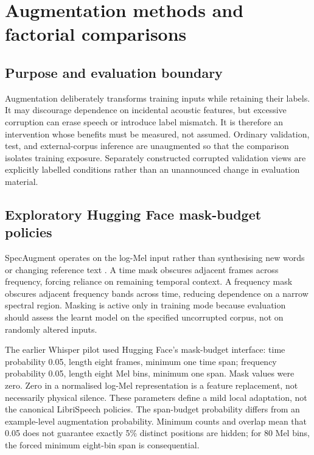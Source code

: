 \documentclass[12pt,a4paper]{report}
\begin{document}
\section{Augmentation methods and factorial comparisons}
\label{sec:augmentation}

\subsection{Purpose and evaluation boundary}

Augmentation deliberately transforms training inputs while retaining their labels. It may discourage dependence on incidental acoustic features, but excessive corruption can erase speech or introduce label mismatch. It is therefore an intervention whose benefits must be measured, not assumed. Ordinary validation, test, and external-corpus inference are unaugmented so that the comparison isolates training exposure. Separately constructed corrupted validation views are explicitly labelled conditions rather than an unannounced change in evaluation material.

\subsection{Exploratory Hugging Face mask-budget policies}

SpecAugment operates on the log-Mel input rather than synthesising new words or changing reference text \citep{Park2019}. A time mask obscures adjacent frames across frequency, forcing reliance on remaining temporal context. A frequency mask obscures adjacent frequency bands across time, reducing dependence on a narrow spectral region. Masking is active only in training mode because evaluation should assess the learnt model on the specified uncorrupted corpus, not on randomly altered inputs.

The earlier Whisper pilot used Hugging Face's mask-budget interface: time probability 0.05, length eight frames, minimum one time span; frequency probability 0.05, length eight Mel bins, minimum one span. Mask values were zero. Zero in a normalised log-Mel representation is a feature replacement, not necessarily physical silence. These parameters define a mild local adaptation, not the canonical LibriSpeech policies. The span-budget probability differs from an example-level augmentation probability. Minimum counts and overlap mean that 0.05 does not guarantee exactly 5\% distinct positions are hidden; for 80 Mel bins, the forced minimum eight-bin span is consequential.
\end{document}
